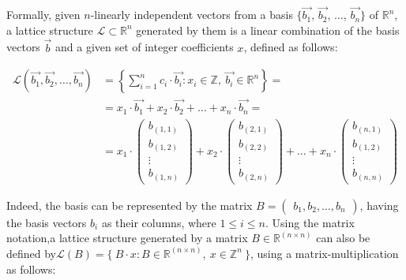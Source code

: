 \documentclass[runningheads]{llncs}
\numberwithin{equation}{section}
\begin{document}
    \noindent Formally, given $n$-linearly independent vectors from a basis $\{\Vec{{b}_{1}}$, $\Vec{{b}_{2}}$, $\dots$, $\Vec{{b}_{n}}\}$ of ${\mathbb{R}}^{n}$, a lattice structure $\mathcal{L} \subset {\mathbb{R}^{n}}$ generated by them is a linear combination of the basis vectors $\Vec{b}$ and a given set of integer coefficients $x$, defined as follows:
    
    \begin{equation}
        \begin{split}     
            \mathcal{L}(\Vec{{b}_{1}}, \Vec{{b}_{2}}, \dots, \Vec{{b}_{n}}) & = \left\{ \sum_{i = 1}^{n} {c}_{i} \cdot \Vec{{b}_{i}}: {x}_{i} \in \mathbb{Z},\ \Vec{{b}_{i}} \in {\mathbb{R}}^{n} \right\} = \\
            & = {x}_{1} \cdot \Vec{{b}_{1}} + {x}_{2} \cdot \Vec{{b}_{2}} + \dots + {x}_{n} \cdot \Vec{{b}_{n}} = \\
            & = {x}_{1} \cdot
            \begin{pmatrix} 
                {b}_{(1, 1)} \\ {b}_{(1, 2)} \\ \vdots \\ {b}_{(1, n)}
            \end{pmatrix}
            + {x}_{2} \cdot
            \begin{pmatrix} 
                {b}_{(2, 1)} \\ {b}_{(2, 2)} \\ \vdots \\ {b}_{(2, n)}
            \end{pmatrix}
            + \dots + {x}_{n} \cdot
            \begin{pmatrix}
                {b}_{(n, 1)} \\ {b}_{(1, 2)} \\ \vdots \\ {b}_{(n, n)}
            \end{pmatrix}
        \end{split}
        \label{equ:lattice-structure-definition-1}
    \end{equation}
    \vspace{1ex}

    \newpage
    
    \noindent Indeed, the basis can be represented by the matrix $B = \begin{pmatrix} {b}_{1}, {b}_{2}, \dots, {b}_{n} \end{pmatrix}$, having the basis vectors ${b}_{i}$ as their columns, where $1 \leq i \leq n$. Using the matrix notation,\break a lattice structure generated by a matrix $B \in {\mathbb{R}}^{(n \times n)}$ can also be defined by\break $\mathcal{L}(B) = \{\ B \cdot x: B \in {\mathbb{R}}^{(n \times n)},\ x \in {\mathbb{Z}}^{n}\ \}$, using a matrix-multiplication as follows:
\end{document}
